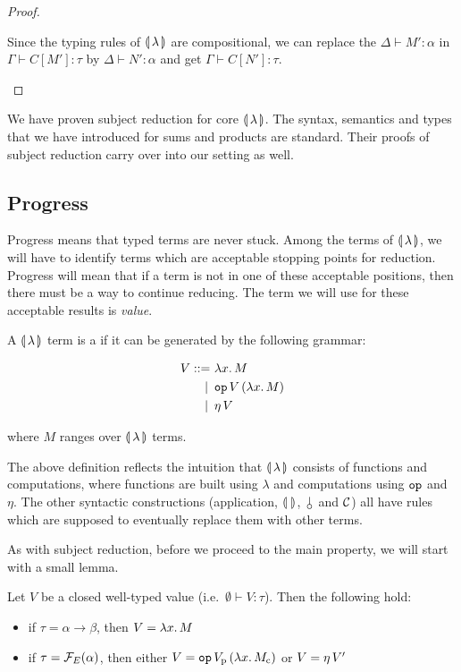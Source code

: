 \begin{proof}
\begin{itemize}
    Since the typing rules of $\llparenthesis \, \lambda \, \rrparenthesis$ are compositional, we can
    replace the $\Delta \vdash M' : \alpha$ in $\Gamma \vdash C[M'] : \tau$
    by $\Delta \vdash N' : \alpha$ and get $\Gamma \vdash C[N'] : \tau$.
  \end{itemize}
\end{proof}

We have proven subject reduction for core $\llparenthesis \, \lambda \, \rrparenthesis$. The syntax,
semantics and types that we have introduced for sums and products are
standard. Their proofs of subject reduction carry over into our setting as
well.


\subsection{Progress}
\label{ssec:progress}

Progress means that typed terms are never stuck. Among the terms of
$\llparenthesis \, \lambda \, \rrparenthesis$, we will have to identify terms which are acceptable
stopping points for reduction. Progress will mean that if a term is not in
one of these acceptable positions, then there must be a way to continue
reducing. The term we will use for these acceptable results is
\emph{value}.

\begin{definition}\label{def:value}
  A $\llparenthesis \, \lambda \, \rrparenthesis$ term is a  if it can be generated by
  the following grammar:

\begin{align*}
  V ::= &\ \lambda x.\, M \\
   | \, &\ \mathtt{op}\,V\,(\lambda x.\, M) \\
   | \, &\ \eta\,V
\end{align*}

  where $M$ ranges over $\llparenthesis \, \lambda \, \rrparenthesis$ terms.
\end{definition}

The above definition reflects the intuition that $\llparenthesis \, \lambda \, \rrparenthesis$
consists of functions and computations, where functions are built using
$\lambda$ and computations using $\mathtt{op}$ and $\eta$. The other syntactic
constructions (application, $\llparenthesis \,  \, \rrparenthesis$, $\cherry$ and $\mathcal{C}$) all have
rules which are supposed to eventually replace them with other terms.

As with subject reduction, before we proceed to the main property, we will
start with a small lemma.

\begin{lemma}\label{lem:value-classification}

  Let $V$ be a closed well-typed value (i.e.\ $\emptyset \vdash V :
  \tau$). Then the following hold:

  \begin{itemize}
  \item if $\tau = \alpha \to \beta$, then $V = \lambda x.\, M$
  \item if $\tau = \mathcal{F}_E(\alpha)$, then either
    $V = \mathtt{op}\,V_{\mathrm{p}}\,(\lambda x.\, M_{\mathrm{c}})$ or $V = \eta\,V'$
  \end{itemize}
\end{lemma}

